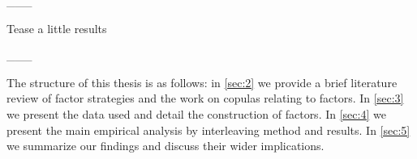 ___

Tease a little results
 
___

The structure of this thesis is as follows: in \autoref{sec:2} we provide a brief literature review of factor strategies and the work on copulas relating to factors. In \autoref{sec:3} we present the data used and detail the construction of factors. In \autoref{sec:4} we present the main empirical analysis by interleaving method and results. In \autoref{sec:5} we summarize our findings and discuss their wider implications.